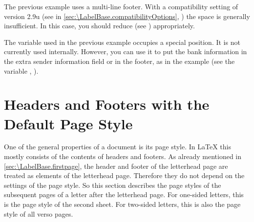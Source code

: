 The previous example uses a multi-line footer.  With a compatibility setting
of version 2.9u (see  in
\autoref{sec:\LabelBase.compatibilityOptions},
) the space is generally insufficient.
In this case, you should reduce  (see
) appropriately.%
\EndIndexGroup

\begin{Declaration}
\end{Declaration}%
%
The  variable used in the previous example
occupies a special position. It is not currently used internally. However, you
can use it to put the bank information in the
extra sender information field or in the footer, as in the example (see
the variable ,
).%
%
\EndIndexGroup
%
\EndIndexGroup




\section{Headers and Footers with the Default Page Style}
\BeginIndexGroup
{}%
%
%

One of the general properties of a document is its page style. In \LaTeX{}
this mostly consists of the contents of headers and footers.
As already mentioned in
\autoref{sec:\LabelBase.firstpage}, the header and footer of the letterhead
page are treated as elements of the letterhead page. Therefore they do not
depend on the settings of the page style. So this section describes the page
styles of the subsequent pages of a letter after the letterhead page. For
one-sided letters, this is the page style of the second sheet. For two-sided
letters, this is also the page style of all verso pages.



